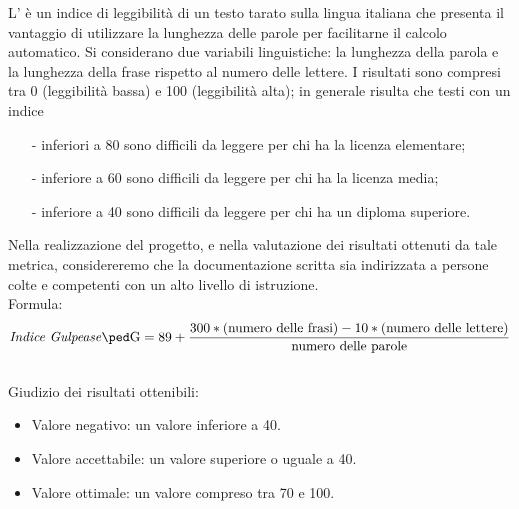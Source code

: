 \documentclass[a4paper, titlepage]{article}
\begin{document}
\label{par:IG}
L' è un indice di leggibilità di un testo tarato sulla lingua italiana che presenta il vantaggio di utilizzare la lunghezza delle parole per facilitarne il calcolo automatico. Si considerano due variabili linguistiche: la lunghezza della parola e la lunghezza della frase rispetto al numero delle lettere.
\newline I risultati sono compresi tra 0 (leggibilità bassa) e 100 (leggibilità alta); in generale risulta che testi con un indice
\begin{itemize}
\item[-]inferiori a 80 sono difficili da leggere per chi ha la
licenza elementare;
\item[-]inferiore a 60 sono difficili da leggere per chi ha la
licenza media;
\item[-]inferiore a 40 sono difficili da leggere per chi ha un
diploma superiore.
\end{itemize}
Nella realizzazione del progetto, e nella valutazione dei risultati ottenuti da tale metrica, considereremo che la documentazione scritta sia indirizzata a persone colte e competenti con un alto livello di istruzione.
\\
\newline Formula:
\begin{displaymath}
\mbox{\gl{Indice Gulpease}}= 89+\frac{300*\mbox{(numero delle frasi)}-10*\mbox{(numero delle lettere)}}{\mbox{numero delle parole}}
\end{displaymath}
\\
\newline Giudizio dei risultati ottenibili:
\begin{itemize}
\item Valore negativo: un valore inferiore a 40. 
\item Valore accettabile: un valore superiore o uguale a 40.
\item Valore ottimale: un valore compreso tra 70 e 100.
\end{itemize}
\end{document}
